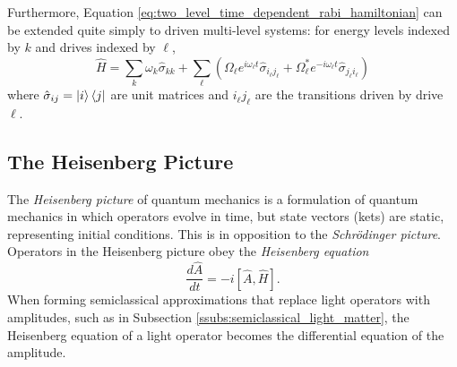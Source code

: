 Furthermore, Equation \ref{eq:two_level_time_dependent_rabi_hamiltonian} can be extended quite simply to driven multi-level systems: for energy levels indexed by $k$ and drives indexed by $\ell$,
\begin{equation}
    \hat{H} = \sum_{k} \omega_k\hat{\sigma}_{kk} + \sum_{\ell} \left(\Omega_\ell e^{i\omega_\ell t} \hat{\sigma}_{i_\ell j_\ell} + \Omega^*_\ell e^{-i\omega_\ell t} \hat{\sigma}_{j_\ell i_\ell}\right) \label{eq:multi_level_time_dependent_rabi_hamiltonian}
\end{equation}
where $\hat{\sigma}_{ij} = \left|i\right\rangle\left\langle j\right|$ are unit matrices and $i_\ell j_\ell$ are the transitions driven by drive $\ell$.

\subsection{\label{subs:heisenberg_picture}The Heisenberg Picture}
The \textit{Heisenberg picture} of quantum mechanics is a formulation of quantum mechanics in which operators evolve in time, but state vectors (kets) are static, representing initial conditions. This is in opposition to the \textit{Schr\"{o}dinger picture}. Operators in the Heisenberg picture obey the \textit{Heisenberg equation}\cite{sakurai_book}
\begin{equation}
    \frac{d\hat{A}}{dt} = -i[\hat{A}, \hat{H}].
\end{equation}
When forming semiclassical approximations that replace light operators with amplitudes, such as in Subsection \ref{ssubs:semiclassical_light_matter}, the Heisenberg equation of a light operator becomes the differential equation of the amplitude.

